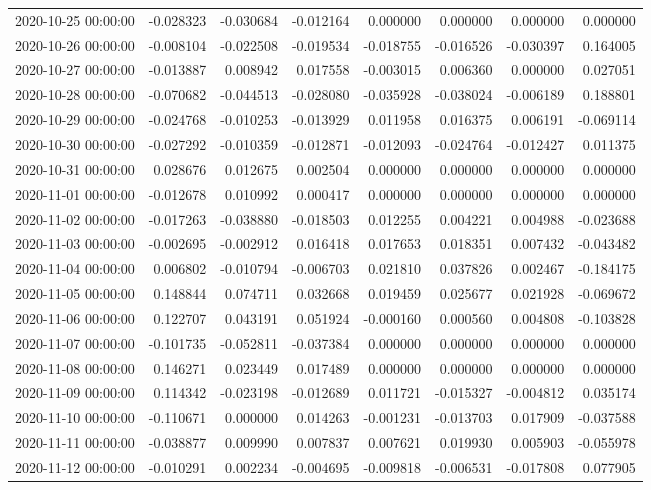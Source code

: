 \begin{tabular}{lrrrrrrr}
2020-10-25 00:00:00 & -0.028323 & -0.030684 & -0.012164 & 0.000000 & 0.000000 & 0.000000 & 0.000000 \\
2020-10-26 00:00:00 & -0.008104 & -0.022508 & -0.019534 & -0.018755 & -0.016526 & -0.030397 & 0.164005 \\
2020-10-27 00:00:00 & -0.013887 & 0.008942 & 0.017558 & -0.003015 & 0.006360 & 0.000000 & 0.027051 \\
2020-10-28 00:00:00 & -0.070682 & -0.044513 & -0.028080 & -0.035928 & -0.038024 & -0.006189 & 0.188801 \\
2020-10-29 00:00:00 & -0.024768 & -0.010253 & -0.013929 & 0.011958 & 0.016375 & 0.006191 & -0.069114 \\
2020-10-30 00:00:00 & -0.027292 & -0.010359 & -0.012871 & -0.012093 & -0.024764 & -0.012427 & 0.011375 \\
2020-10-31 00:00:00 & 0.028676 & 0.012675 & 0.002504 & 0.000000 & 0.000000 & 0.000000 & 0.000000 \\
2020-11-01 00:00:00 & -0.012678 & 0.010992 & 0.000417 & 0.000000 & 0.000000 & 0.000000 & 0.000000 \\
2020-11-02 00:00:00 & -0.017263 & -0.038880 & -0.018503 & 0.012255 & 0.004221 & 0.004988 & -0.023688 \\
2020-11-03 00:00:00 & -0.002695 & -0.002912 & 0.016418 & 0.017653 & 0.018351 & 0.007432 & -0.043482 \\
2020-11-04 00:00:00 & 0.006802 & -0.010794 & -0.006703 & 0.021810 & 0.037826 & 0.002467 & -0.184175 \\
2020-11-05 00:00:00 & 0.148844 & 0.074711 & 0.032668 & 0.019459 & 0.025677 & 0.021928 & -0.069672 \\
2020-11-06 00:00:00 & 0.122707 & 0.043191 & 0.051924 & -0.000160 & 0.000560 & 0.004808 & -0.103828 \\
2020-11-07 00:00:00 & -0.101735 & -0.052811 & -0.037384 & 0.000000 & 0.000000 & 0.000000 & 0.000000 \\
2020-11-08 00:00:00 & 0.146271 & 0.023449 & 0.017489 & 0.000000 & 0.000000 & 0.000000 & 0.000000 \\
2020-11-09 00:00:00 & 0.114342 & -0.023198 & -0.012689 & 0.011721 & -0.015327 & -0.004812 & 0.035174 \\
2020-11-10 00:00:00 & -0.110671 & 0.000000 & 0.014263 & -0.001231 & -0.013703 & 0.017909 & -0.037588 \\
2020-11-11 00:00:00 & -0.038877 & 0.009990 & 0.007837 & 0.007621 & 0.019930 & 0.005903 & -0.055978 \\
2020-11-12 00:00:00 & -0.010291 & 0.002234 & -0.004695 & -0.009818 & -0.006531 & -0.017808 & 0.077905 \\

\end{tabular}
